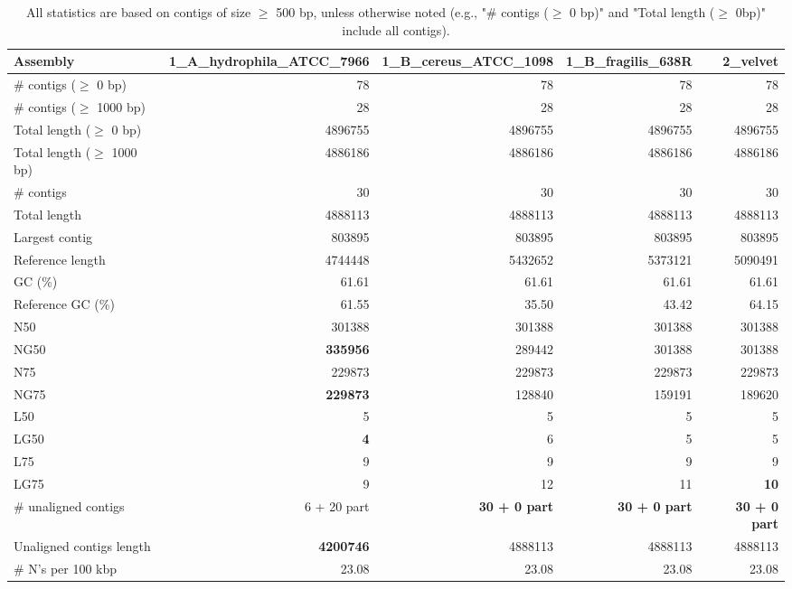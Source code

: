\documentclass[12pt,a4paper]{article}
\begin{document}
\begin{table}[ht]
\begin{center}
\caption{All statistics are based on contigs of size $\geq$ 500 bp, unless otherwise noted (e.g., "\# contigs ($\geq$ 0 bp)" and "Total length ($\geq$ 0bp)" include all contigs).}
\begin{tabular}{|l*{4}{|r}|}
\hline
Assembly & 1\_A\_hydrophila\_ATCC\_7966 & 1\_B\_cereus\_ATCC\_1098 & 1\_B\_fragilis\_638R & 2\_velvet \\ \hline
\# contigs ($\geq$ 0 bp) & 78 & 78 & 78 & 78 \\ \hline
\# contigs ($\geq$ 1000 bp) & 28 & 28 & 28 & 28 \\ \hline
Total length ($\geq$ 0 bp) & 4896755 & 4896755 & 4896755 & 4896755 \\ \hline
Total length ($\geq$ 1000 bp) & 4886186 & 4886186 & 4886186 & 4886186 \\ \hline
\# contigs & 30 & 30 & 30 & 30 \\ \hline
Total length & 4888113 & 4888113 & 4888113 & 4888113 \\ \hline
Largest contig & 803895 & 803895 & 803895 & 803895 \\ \hline
Reference length & 4744448 & 5432652 & 5373121 & 5090491 \\ \hline
GC (\%) & 61.61 & 61.61 & 61.61 & 61.61 \\ \hline
Reference GC (\%) & 61.55 & 35.50 & 43.42 & 64.15 \\ \hline
N50 & 301388 & 301388 & 301388 & 301388 \\ \hline
NG50 & {\bf 335956} & 289442 & 301388 & 301388 \\ \hline
N75 & 229873 & 229873 & 229873 & 229873 \\ \hline
NG75 & {\bf 229873} & 128840 & 159191 & 189620 \\ \hline
L50 & 5 & 5 & 5 & 5 \\ \hline
LG50 & {\bf 4} & 6 & 5 & 5 \\ \hline
L75 & 9 & 9 & 9 & 9 \\ \hline
LG75 & 9 & 12 & 11 & {\bf 10} \\ \hline
\# unaligned contigs & 6 + 20 part & {\bf 30 + 0 part} & {\bf 30 + 0 part} & {\bf 30 + 0 part} \\ \hline
Unaligned contigs length & {\bf 4200746} & 4888113 & 4888113 & 4888113 \\ \hline
\# N's per 100 kbp & 23.08 & 23.08 & 23.08 & 23.08 \\ \hline
\end{tabular}
\end{center}
\end{table}
\end{document}
